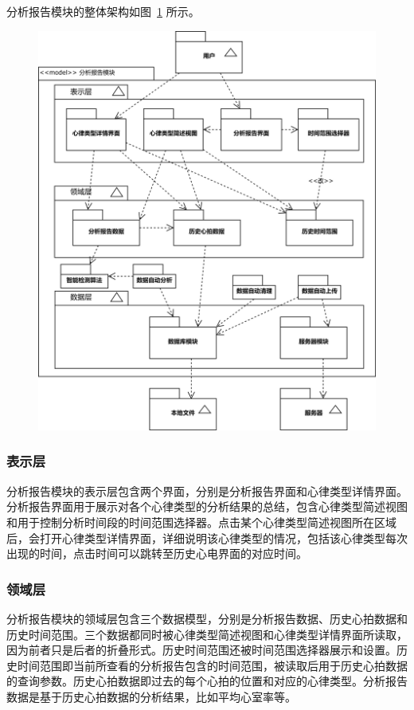 分析报告模块的整体架构如图~\ref{fig:model-analytics} 所示。

\begin{figure}[ht]
    \centering
    \includegraphics[width=.8\textwidth]{../assets/model-analytics.drawio}
    \label{fig:model-analytics}
\end{figure}

\subsubsection{表示层}

分析报告模块的表示层包含两个界面，分别是分析报告界面和心律类型详情界面。分析报告界面用于展示对各个心律类型的分析结果的总结，包含心律类型简述视图和用于控制分析时间段的时间范围选择器。点击某个心律类型简述视图所在区域后，会打开心律类型详情界面，详细说明该心律类型的情况，包括该心律类型每次出现的时间，点击时间可以跳转至历史心电界面的对应时间。

\subsubsection{领域层}

分析报告模块的领域层包含三个数据模型，分别是分析报告数据、历史心拍数据和历史时间范围。三个数据都同时被心律类型简述视图和心律类型详情界面所读取，因为前者只是后者的折叠形式。历史时间范围还被时间范围选择器展示和设置。历史时间范围即当前所查看的分析报告包含的时间范围，被读取后用于历史心拍数据的查询参数。历史心拍数据即过去的每个心拍的位置和对应的心律类型。分析报告数据是基于历史心拍数据的分析结果，比如平均心室率等。


